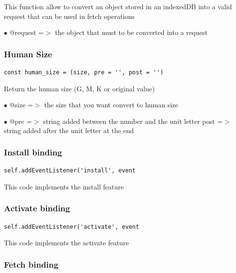 \documentclass[a4paper]{article}
\begin{document}
This function allow to convert an object stored in an indexedDB
into a valid request that can be used in fetch operations

\begin{compactitem}
\item[\color{myblue}$\bullet$] @request =$>$ the object that must to be converted into a request
\end{compactitem}

\hypertarget{toc271}{}
\subsubsection{Human Size}

\begin{lstlisting}
const human_size = (size, pre = '', post = '')
\end{lstlisting}

Return the human size (G, M, K or original value)

\begin{compactitem}
\item[\color{myblue}$\bullet$] @size  =$>$ the size that you want convert to human size
\item[\color{myblue}$\bullet$] @pre  =$>$ string added between the number and the unit letter
post  =$>$ string added after the unit letter at the end
\end{compactitem}

\hypertarget{toc272}{}
\subsubsection{Install binding}

\begin{lstlisting}
self.addEventListener('install', event
\end{lstlisting}

This code implements the install feature

\hypertarget{toc273}{}
\subsubsection{Activate binding}

\begin{lstlisting}
self.addEventListener('activate', event
\end{lstlisting}

This code implements the activate feature

\hypertarget{toc274}{}
\subsubsection{Fetch binding}
\end{document}
